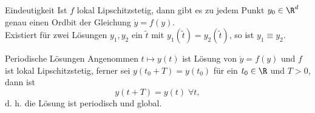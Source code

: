 \begin{karte}{Eindeutigkeit}
    Ist \(f\) lokal Lipschitzstetig, dann gibt es zu jedem Punkt 
    \(y_0 \in \R^d\) genau einen Ordbit der Gleichung \(\dot{y} = f(y)\).\\
    Existiert für zwei Lösungen \(y_1, y_2\) ein \(\tilde{t}\) 
    mit \(y_1(\tilde{t}) = y_2(\tilde{t})\), so ist \(y_1 \equiv y_2\).
\end{karte}

\begin{karte}{Periodische Lösungen}
    Angenommen \(t \mapsto y(t)\) ist Lösung von \(\dot{y} = f(y)\) 
    und \(f\) ist lokal Lipschitzstetig, ferner sei 
    \(y(t_0 + T) = y(t_0)\) für ein \(t_0 \in \R\) und \(T>0\), dann ist 
    \[ y(t+T)=y(t) \;\forall t, \]
    d. h. die Lösung ist periodisch und global.
\end{karte}